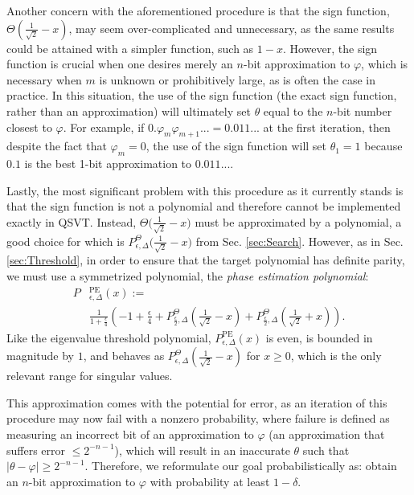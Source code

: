 \documentclass[aps,pra,showpacs,notitlepage,twocolumn,superscriptaddress,nofootinbib]{revtex4-1}
\begin{document}
    Another concern with the aforementioned procedure is that the sign function, $\Theta\left(\frac{1}{\sqrt{2}} - x\right)$, may seem over-complicated and unnecessary, as the same results could be attained with a simpler function, such as $1-x$. However, the sign function is crucial when one desires merely an $n$-bit approximation to $\varphi$, which is necessary when $m$ is unknown or prohibitively large, as is often the case in practice. In this situation, the use of the sign function (the exact sign function, rather than an approximation) will ultimately set $\theta$ equal to the $n$-bit number closest to $\varphi$. For example, if $0. \varphi_m \varphi_{m+1} ... = 0.011...$ at the first iteration, then despite the fact that $\varphi_{m} = 0$, the use of the sign function will set $\theta_1 = 1$ because $0.1$ is the best 1-bit approximation to $0.011...$. 
    
    Lastly, the most significant problem with this procedure as it currently stands is that the sign function is not a polynomial and therefore cannot be implemented exactly in QSVT. Instead, $\Theta\big(\frac{1}{\sqrt{2}} - x\big)$ must be approximated by a polynomial, a good choice for which is $P^{\Theta}_{\epsilon, \Delta} \big(\frac{1}{\sqrt{2}} -x\big)$ from Sec. \ref{sec:Search}. However, as in Sec. \ref{sec:Threshold}, in order to ensure that the target polynomial has definite parity, we must use a symmetrized polynomial, the \emph{phase estimation polynomial}:
    \begin{equation}\label{eq:SignFunction_Target}
    \begin{split}
            P&^{\text{PE}}_{\epsilon,\Delta}(x) := \\
            &\frac{1}{1+\frac{\epsilon}{4}} \left( -1+\frac{\epsilon}{4} +  P^{\Theta}_{\frac{\epsilon}{2},\Delta}\left(\tfrac{1}{\sqrt{2}} - x \right) + P^{\Theta}_{\frac{\epsilon}{2},\Delta}\left(\tfrac{1}{\sqrt{2}} + x \right) \right).
    \end{split}
    \end{equation}
    Like the eigenvalue threshold polynomial, $P^{\text{PE}}_{\epsilon,\Delta}(x)$ is even, is bounded in magnitude by $1$, and behaves as $P^{\Theta}_{\epsilon,\Delta}\left(\frac{1}{\sqrt{2}} - x\right)$ for $x \geq 0$, which is the only relevant range for singular values. 

    
    This approximation comes with the potential for error, as an iteration of this procedure may now fail with a nonzero probability, where failure is defined as measuring an incorrect bit of an approximation to $\varphi$ (an approximation that suffers error $\leq 2^{-n-1}$), which will result in an inaccurate $\theta$ such that $|\theta-\varphi|\geq 2^{-n-1}$. Therefore, we reformulate our goal probabilistically as: obtain an $n$-bit approximation to $\varphi$ with probability at least $1-\delta$.
    
\end{document}

